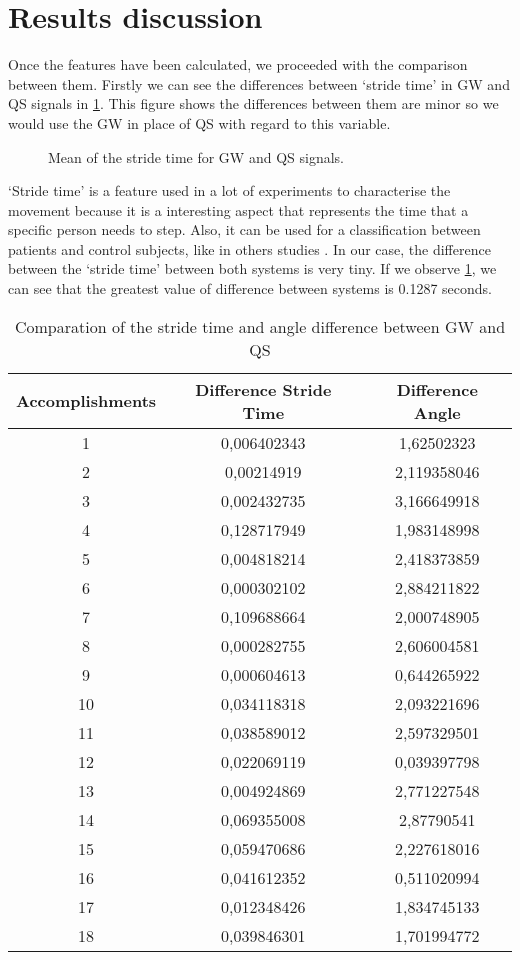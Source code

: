 \section{Results discussion}
Once the features have been calculated, we proceeded with the comparison between them. Firstly we can see the differences between ‘stride time’ in GW and QS signals in \ref{fig:mean_stride_time}. This figure shows the differences between them are minor so we would use the GW in place of QS with regard to this variable.

\begin{figure}[H]
	\centering
	\caption{Mean of the stride time for GW and QS signals.}
	\label{fig:mean_stride_time}
\end{figure}

‘Stride time’ is a feature used in a lot of experiments to characterise the movement because it is a interesting aspect that represents the time that a specific person needs to step. Also, it can be used for a classification between patients and control subjects, like in others studies \cite{Hausdorff}.
In our case, the difference between  the ‘stride time’ between both systems is very tiny. If we observe \ref{tab:Stride_time}, we can see that the greatest value of difference between systems is 0.1287 seconds.

\begin{table}[h]
	\caption{Comparation of the stride time and angle difference between GW and QS}	
	\centering
	\begin{tabular}{|c|c|c|}\hline
		
		Accomplishments & Difference Stride Time	& Difference Angle	 	\\ \hline
		1  & 0,006402343	 & 1,62502323 \\
		2 & 0,00214919	& 2,119358046 \\
		3 & 0,002432735	& 3,166649918 \\
		4 & 0,128717949	& 1,983148998 \\
		5 & 0,004818214	& 2,418373859 \\
		6 & 0,000302102	& 2,884211822 \\
		7 & 0,109688664	& 2,000748905 \\
		8 & 0,000282755	& 2,606004581 \\
		9 & 0,000604613	 & 0,644265922 \\
		10 & 0,034118318	& 2,093221696 \\
		11 & 0,038589012	& 2,597329501 \\
		12 & 0,022069119	& 0,039397798 \\
		13 & 0,004924869	& 2,771227548 \\
		14 & 0,069355008	& 2,87790541 \\
		15 & 0,059470686	& 2,227618016 \\
		16 & 0,041612352	& 0,511020994 \\
		17 & 0,012348426	& 1,834745133 \\
		18 & 0,039846301	& 1,701994772 
	\\ \hline
	\end{tabular}
	\label{tab:Stride_time}
	
\end{table}

